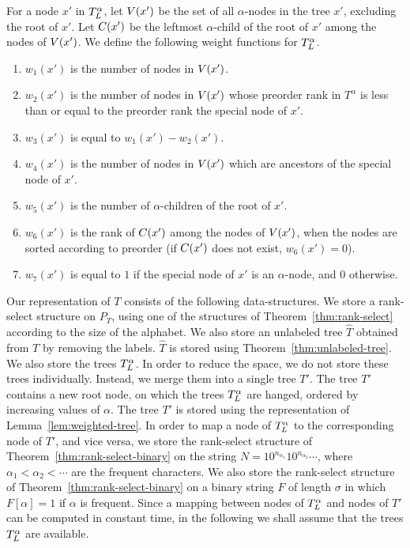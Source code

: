 \documentclass[12pt]{article}
\newcommand{\idxtotal}{1}
\newcommand{\idxle}{2}
\newcommand{\idxgt}{3}
\newcommand{\idxeq}{4}
\newcommand{\idxchildren}{5}
\newcommand{\idxleftmostchild}{6}
\newcommand{\idxspecial}{7}
\begin{document}
For a node $x'$ in $T^\alpha_{L}$, let $V(x')$ be the set
of all $\alpha$-nodes in the tree $x'$, excluding the root of $x'$.
Let $C(x')$ be the leftmost $\alpha$-child of the root of $x'$
among the nodes of $V(x')$.
We define the following weight functions for $T^\alpha_{L}$.
\begin{enumerate}
\item $w_{\idxtotal}(x')$ is the number of nodes in $V(x')$.
\item $w_{\idxle}(x')$ is the number of nodes in $V(x')$
whose preorder rank in $T^\alpha$ is
less than or equal to the preorder rank the special node of $x'$.
\item $w_{\idxgt}(x')$ is equal to $w_{\idxtotal}(x')-w_{\idxle}(x')$.
\item $w_{\idxeq}(x')$ is the number of nodes in $V(x')$
which are ancestors of the special node of $x'$.
\item $w_{\idxchildren}(x')$ is the number of $\alpha$-children of the
root of $x'$.
\item $w_{\idxleftmostchild}(x')$ is the rank of $C(x')$ among the nodes
of $V(x')$, when the nodes are sorted according to preorder
(if $C(x')$ does not exist, $w_{\idxleftmostchild}(x') = 0$).
\item $w_{\idxspecial}(x')$ is equal to $1$ if the special node of
$x'$ is an $\alpha$-node, and $0$ otherwise.
\end{enumerate}

Our representation of $T$ consists of the following data-structures.
We store a rank-select structure on $P_T$, using one of the structures of
Theorem~\ref{thm:rank-select} according to the size of the alphabet.
We also store an unlabeled tree $\hat{T}$ obtained from $T$ by
removing the labels.
$\hat{T}$ is stored using Theorem~\ref{thm:unlabeled-tree}.
We also store the trees $T^\alpha_{L}$.
In order to reduce the space, we do not store these trees individually.
Instead, we merge them into a single tree $T'$.
The tree $T'$ contains a new root node, on which the trees $T^\alpha_{L}$
are hanged, ordered by increasing values of $\alpha$.
The tree $T'$ is stored using the representation of
Lemma~\ref{lem:weighted-tree}.
In order to map a node of $T^\alpha_{L}$
to the corresponding node of $T'$, and vice versa, we store
the rank-select structure of Theorem~\ref{thm:rank-select-binary}
on the string $N=10^{n_{\alpha_1}}10^{n_{\alpha_2}}\cdots$, where
$\alpha_1 < \alpha_2 < \cdots$ are the frequent characters.
We also store the rank-select structure of Theorem~\ref{thm:rank-select-binary}
on a binary string $F$ of length $\sigma$ in which $F[\alpha]=1$ if
$\alpha$ is frequent.
Since a mapping between nodes of $T^\alpha_{L}$ and nodes of $T'$ can
be computed in constant time, in the following we shall assume that the trees
$T^\alpha_{L}$ are available.
\end{document}

